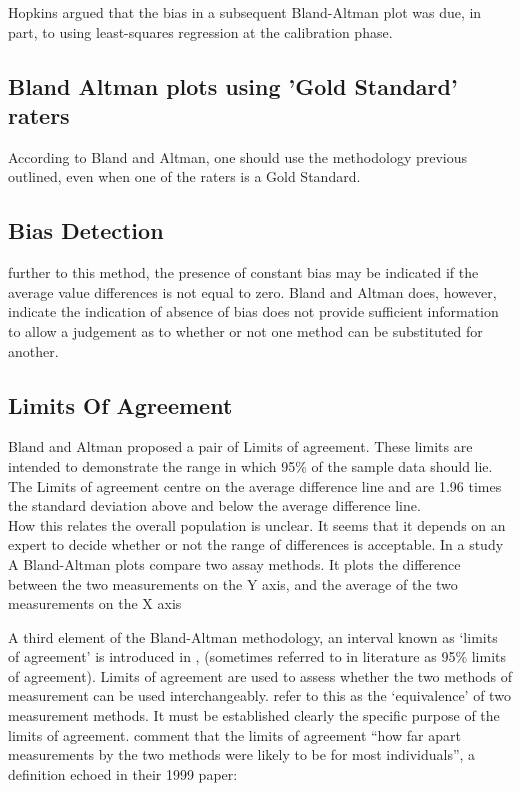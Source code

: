 \documentclass[12pt, a4paper]{report}
\begin{document}
	
	Hopkins argued that the bias in a subsequent Bland-Altman plot was
	due, in part, to using least-squares regression at the calibration
	phase.
	
	\subsection{Bland Altman plots using 'Gold Standard' raters}
	According to Bland and Altman, one should use the methodology
	previous outlined, even when one of the raters is a Gold Standard.
	
	
	\subsection{Bias Detection}
	further to this method, the presence of constant bias may be
	indicated if the average value differences is not equal to zero.
	Bland and Altman does, however, indicate the indication of absence
	of bias does not provide sufficient information to allow a
	judgement as to whether or not one method can be substituted for
	another.
	
	
	
	
	\subsection{Limits Of Agreement}
	Bland and Altman proposed a pair of Limits of agreement. These
	limits are intended to demonstrate the range in which 95\% of the
	sample data should lie. The Limits of agreement centre on the
	average difference line and are 1.96 times the standard deviation
	above and below the average difference line.
	\\
	How this relates the overall population is unclear. It seems that
	it depends on an expert to decide whether or not the range of
	differences is acceptable. In a study A Bland-Altman plots compare
	two assay methods. It plots the difference between the two
	measurements on the Y axis, and the average of the two
	measurements on the X axis
	
	A third element of the Bland-Altman methodology, an interval known
	as `limits of agreement' is introduced in \citet*{BA86},
	(sometimes referred to in literature as 95\% limits of agreement).
	Limits of agreement are used to assess whether the two methods of
	measurement can be used interchangeably. \citet{BA86} refer to
	this as the `equivalence' of two measurement methods. It must be
	established clearly the specific purpose of the limits of
	agreement. \citet*{BA95} comment that the limits of agreement
	``how far apart measurements by the two methods were likely to be
	for most individuals'', a definition echoed in their 1999 paper:
	
\end{document}
